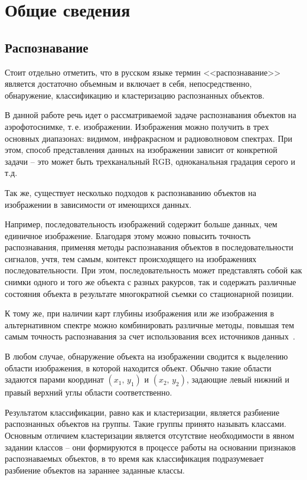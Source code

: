 \chapter{Общие сведения}

\section{Распознавание}

Стоит отдельно отметить, что в русском языке термин <<распознавание>> является достаточно объемным и включает в себя, непосредственно, обнаружение, классификацию и кластеризацию распознанных объектов.

В данной работе речь идет о рассматриваемой задаче распознавания объектов на аэрофотоснимке, т.\,е. изображении. Изображения можно получить в трех основных диапазонах: видимом, инфракрасном и радиоволновом спектрах. При этом, способ представления данных на изображении зависит от конкретной задачи -- это может быть трехканальный RGB, одноканальная градация серого и т.д.

Так же, существует несколько подходов к распознаванию объектов на изображении в зависимости от имеющихся данных.

Например, последовательность изображений содержит больше данных, чем единичное изображение. Благодаря этому можно повысить точность распознавания, применяя методы распознавания объектов в последовательности сигналов, учтя, тем самым, контекст происходящего на изображениях последовательности. При этом, последовательность может представлять собой как снимки одного и того же объекта с разных ракурсов, так и содержать различные состояния объекта в результате многократной съемки со стационарной позиции.

К тому же, при наличии карт глубины изображения или же изображения в альтернативном спектре можно комбинировать различные методы, повышая тем самым точность распознавания за счет использования всех источников данных~\cite{ensamble-methods}.

В любом случае, обнаружение объекта на изображении сводится к выделению области изображения, в которой находится объект. Обычно такие области задаются парами координат $(x_1,\,y_1)$ и $(x_2,\,y_2)$, задающие левый нижний и правый верхний углы области соответственно.

Результатом классификации, равно как и кластеризации, является разбиение распознанных объектов на группы. Такие группы принято называть классами. Основным отличием кластеризации является отсутствие необходимости в явном задании классов -- они формируются в процессе работы на основании признаков распознаваемых объектов, в то время как классификация подразумевает разбиение объектов на зараннее заданные классы.

